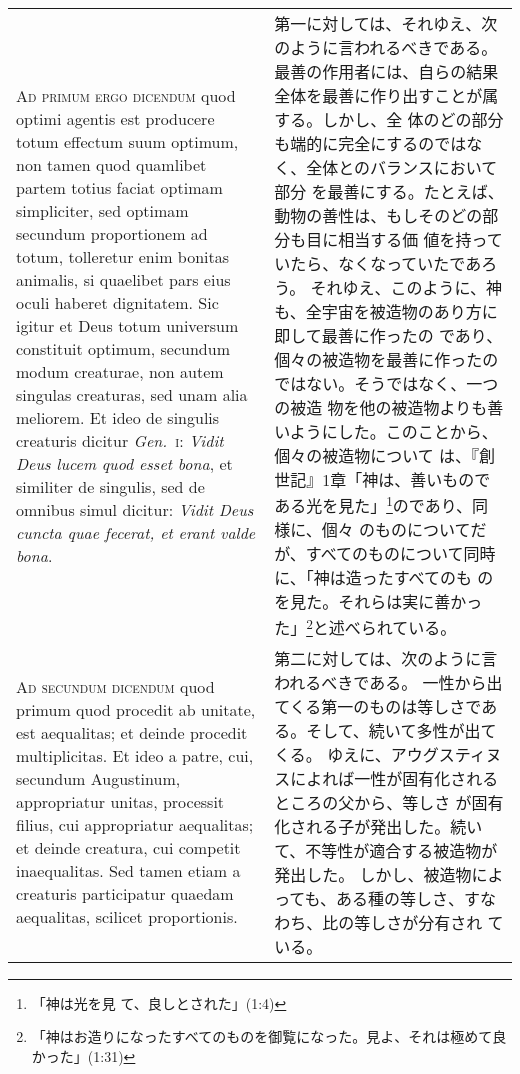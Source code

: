 \documentclass[10pt]{jsarticle} %
\begin{document}
\begin{longtable}{p{21em}p{21em}}
\\


{\scshape Ad primum ergo dicendum} quod optimi agentis est producere
totum effectum suum optimum, non tamen quod quamlibet partem totius
faciat optimam simpliciter, sed optimam secundum proportionem ad totum,
tolleretur enim bonitas animalis, si quaelibet pars eius oculi haberet
dignitatem. Sic igitur et Deus totum universum constituit optimum,
secundum modum creaturae, non autem singulas creaturas, sed unam alia
meliorem. Et ideo de singulis creaturis dicitur {\itshape
Gen.}~{\scshape i}: {\itshape Vidit Deus lucem quod esset bona}, et
similiter de singulis, sed de omnibus simul dicitur: {\itshape Vidit
Deus cuncta quae fecerat, et erant valde bona}.

&
第一に対しては、それゆえ、次のように言われるべきである。
最善の作用者には、自らの結果全体を最善に作り出すことが属する。しかし、全
 体のどの部分も端的に完全にするのではなく、全体とのバランスにおいて部分
 を最善にする。たとえば、動物の善性は、もしそのどの部分も目に相当する価
 値を持っていたら、なくなっていたであろう。
それゆえ、このように、神も、全宇宙を被造物のあり方に即して最善に作ったの
 であり、個々の被造物を最善に作ったのではない。そうではなく、一つの被造
 物を他の被造物よりも善いようにした。このことから、個々の被造物について
 は、『創世記』1章「神は、善いものである光を見た」\footnote{「神は光を見
 て、良しとされた」(1:4)}のであり、同様に、個々
 のものについてだが、すべてのものについて同時に、「神は造ったすべてのも
 のを見た。それらは実に善かった」\footnote{「神はお造りになったすべてのものを御覧になった。見よ、それは極めて良かった」(1:31)}と述べられている。


\\


{\scshape Ad secundum dicendum} quod primum quod
procedit ab unitate, est aequalitas; et deinde procedit
multiplicitas. Et ideo a patre, cui, secundum Augustinum, appropriatur
unitas, processit filius, cui appropriatur aequalitas; et deinde
creatura, cui competit inaequalitas. Sed tamen etiam a creaturis
participatur quaedam aequalitas, scilicet proportionis.

&
第二に対しては、次のように言われるべきである。
一性から出てくる第一のものは等しさである。そして、続いて多性が出てくる。
ゆえに、アウグスティヌスによれば一性が固有化されるところの父から、等しさ
 が固有化される子が発出した。続いて、不等性が適合する被造物が発出した。
しかし、被造物によっても、ある種の等しさ、すなわち、比の等しさが分有され
 ている。


\\



\end{longtable}
\end{document}
